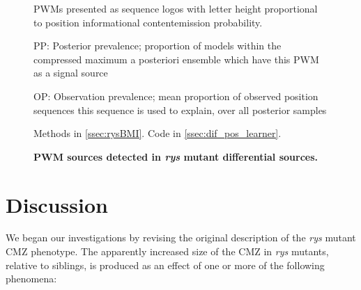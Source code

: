 \documentclass{ut-thesis}
\begin{document}
\begin{NoHyper}
\begin{figure}[!h]
    \caption{{\bf PWM sources detected in \textit{rys} mutant differential sources.}}
    PWMs presented as sequence logos with letter height proportional to position informational content\/emission probability.

    PP: Posterior prevalence; proportion of models within the compressed maximum a posteriori ensemble which have this PWM as a signal source

    OP: Observation prevalence; mean proportion of observed position sequences this sequence is used to explain, over all posterior samples

    Methods in \autoref{ssec:rysBMI}.
    Code in \autoref{ssec:dif_pos_learner}.
    \label{rysmotifs}
\end{figure}

\FloatBarrier

\section{Discussion}
We began our investigations by revising the original description of the \textit{rys} mutant CMZ phenotype. The apparently increased size of the CMZ in \textit{rys} mutants, relative to siblings, is produced as an effect of one or more of the following phenomena:


\end{NoHyper}
\end{document}
